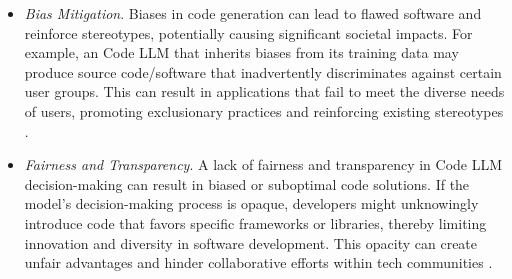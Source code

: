 \begin{itemize}
    \item \textit{Bias Mitigation}. Biases in code generation can lead to flawed software and reinforce stereotypes, potentially causing significant societal impacts. For example, an Code LLM that inherits biases from its training data may produce source code/software that inadvertently discriminates against certain user groups. This can result in applications that fail to meet the diverse needs of users, promoting exclusionary practices and reinforcing existing stereotypes \cite{mouselinos2022simple,liu2023uncovering}.
    \item \textit{Fairness and Transparency}. A lack of fairness and transparency in Code LLM decision-making can result in biased or suboptimal code solutions. If the model's decision-making process is opaque, developers might unknowingly introduce code that favors specific frameworks or libraries, thereby limiting innovation and diversity in software development. This opacity can create unfair advantages and hinder collaborative efforts within tech communities \cite{bogina2022educating}.

\end{itemize}
